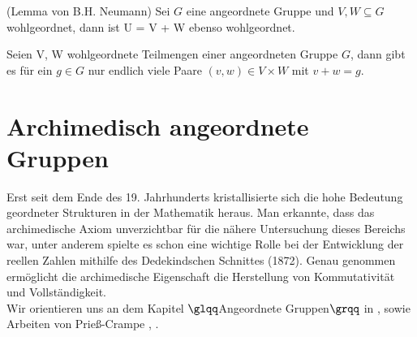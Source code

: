 \begin{lemma}\label{LemmaNeumann} (Lemma von B.H. Neumann) %
Sei $G$ eine angeordnete Gruppe und $V, W \subseteq G$ wohlgeordnet, dann ist U = V + W ebenso wohlgeordnet. 
\end{lemma}
%
%
% 
%
%
%
%
\begin{folg}\label{FolgerungNeumann} %
Seien V, W wohlgeordnete Teilmengen einer angeordneten Gruppe $G$, dann gibt es für ein $g \in G$ nur endlich viele Paare $\left(v, w\right) \in V\times W$ mit $v + w = g$.
\end{folg}
%
%
%
%
%
%
%
%
%
%
\section{Archimedisch angeordnete Gruppen}\label{Archimedisch angeordnete Gruppen}
%
Erst seit dem Ende des 19. Jahrhunderts kristallisierte sich die hohe Bedeutung geordneter Strukturen in der Mathematik heraus. Man erkannte, dass das archimedische Axiom unverzichtbar für die nähere Untersuchung dieses Bereichs war, unter anderem spielte es schon eine wichtige Rolle bei der Entwicklung der reellen Zahlen mithilfe des Dedekindschen Schnittes (1872). Genau genommen ermöglicht die archimedische Eigenschaft die Herstellung von Kommutativität und Vollständigkeit. \\ %
Wir orientieren uns an dem Kapitel $\glqq$Angeordnete Gruppen$\grqq$ in \cite[S. 73 - 93]{fuchs66}, sowie Arbeiten von Prieß-Crampe \cite{priesscrampe69}, \cite{priesscrampe83}.

